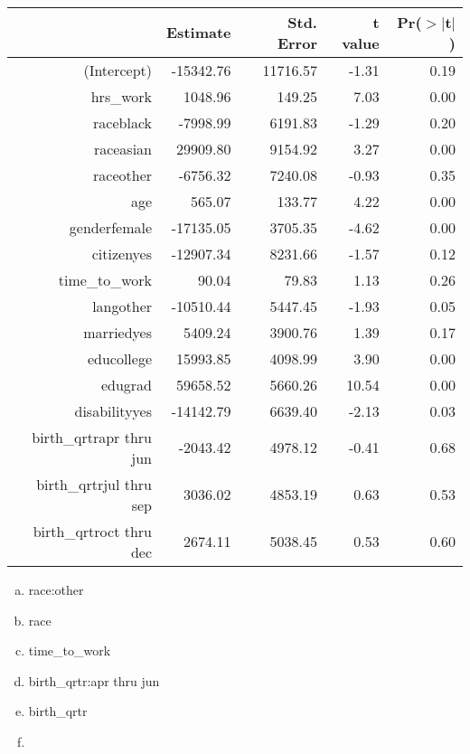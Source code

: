 \documentclass[11pt,containsverbatim,handout,xcolor=xelatex,dvipsnames,table]{beamer}
\newcommand{\solnMult}[1]{#1}
\begin{document}
\begin{frame}
\frametitle{}


\begin{center}
{\tiny
\begin{tabular}{rrrrr}
  \hline
 & Estimate & Std. Error & t value & Pr($>$$|$t$|$) \\ 
  \hline
(Intercept) & -15342.76 & 11716.57 & -1.31 & 0.19 \\ 
  hrs\_work & 1048.96 & 149.25 & 7.03 & 0.00 \\ 
  raceblack & -7998.99 & 6191.83 & -1.29 & 0.20 \\ 
  raceasian & 29909.80 & 9154.92 & 3.27 & 0.00 \\ 
  raceother & -6756.32 & 7240.08 & -0.93 & 0.35 \\ 
  age & 565.07 & 133.77 & 4.22 & 0.00 \\ 
  genderfemale & -17135.05 & 3705.35 & -4.62 & 0.00 \\ 
  citizenyes & -12907.34 & 8231.66 & -1.57 & 0.12 \\ 
  time\_to\_work & 90.04 & 79.83 & 1.13 & 0.26 \\ 
  langother & -10510.44 & 5447.45 & -1.93 & 0.05 \\ 
  marriedyes & 5409.24 & 3900.76 & 1.39 & 0.17 \\ 
  educollege & 15993.85 & 4098.99 & 3.90 & 0.00 \\ 
  edugrad & 59658.52 & 5660.26 & 10.54 & 0.00 \\ 
  disabilityyes & -14142.79 & 6639.40 & -2.13 & 0.03 \\ 
  birth\_qrtrapr thru jun & -2043.42 & 4978.12 & -0.41 & 0.68 \\ 
  birth\_qrtrjul thru sep & 3036.02 & 4853.19 & 0.63 & 0.53 \\ 
  birth\_qrtroct thru dec & 2674.11 & 5038.45 & 0.53 & 0.60 \\ 
   \hline
\end{tabular}
}
\end{center}

\begin{multicols}{2}
\begin{enumerate}[(a)]
\item race:other
\item race
\item time\_to\_work
\item birth\_qrtr:apr thru jun
\item \solnMult{birth\_qrtr}
\item[]
\end{enumerate}
\end{multicols}

\end{frame}
\end{document}
